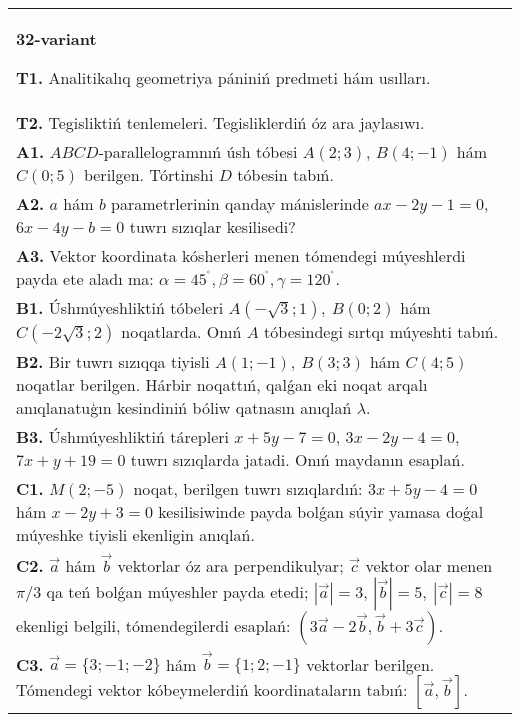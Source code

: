\documentclass{article}
\begin{document}
\begin{tabular}{m{17cm}}
\textbf{32-variant}

\textbf{T1.} Analitikalıq geometriya pániniń predmeti hám usılları.
 \\
\textbf{T2.} 
Tegisliktiń tenlemeleri. Tegisliklerdiń óz ara jaylasıwı.
 \\
\textbf{A1.} 
$ABCD$-parallelogramnıń úsh tóbesi
$A (2;3) $, $B (4;-1) $ hám $C (0;5) $ berilgen. Tórtinshi $D$
tóbesin tabıń.
 \\
\textbf{A2.} 
$a$ hám $b$ parametrlerinin qanday mánislerinde
$ax-2y-1=0$, $6x-4y-b=0$ tuwrı sızıqlar kesilisedi?
 \\
\textbf{A3.} 
Vektor koordinata kósherleri menen tómendegi múyeshlerdi payda ete aladı ma:
$\alpha = 45^{{^\circ}},\beta = 60^{{^\circ}},\gamma = 120^{{^\circ}}$.
 \\
\textbf{B1.} 
Úshmúyeshliktiń tóbeleri
\(A\left(-\sqrt{3};1 \right),\ B (0;2) \) hám
\(C\left(-2\sqrt{3};2 \right) \) noqatlarda. Onıń $A$
tóbesindegi sırtqı múyeshti tabıń.
 \\
\textbf{B2.} 
Bir tuwrı sızıqqa tiyisli \(A (1;-1),\ B (3;3) \) hám
\(C (4;5) \) noqatlar berilgen. Hárbir noqattıń, qalǵan eki noqat arqalı anıqlanatuģın kesindiniń bóliw qatnasın anıqlań $\lambda$.
 \\
\textbf{B3.} 
Úshmúyeshliktiń tárepleri \(x+5y-7=0\),
\(3x-2y-4=0\), \(7x+y+19=0\) tuwrı sızıqlarda jatadi. Onıń
maydanın esaplań.
 \\
\textbf{C1.} 
\(M (2;-5) \) noqat, berilgen tuwrı sızıqlardıń:
\(3x+5y-4=0\) hám \(x-2y+3=0\) kesilisiwinde payda 
bolǵan súyir yamasa doǵal múyeshke tiyisli ekenligin anıqlań.
 \\
\textbf{C2.} 
$\vec{a}$ hám $\vec{b}$ vektorlar óz ara perpendikulyar; $\vec{c}$ vektor olar menen $\pi/3$ qa teń bolǵan múyeshler payda etedi; $|\vec{a}| = 3$, $|\vec{b}| = 5,\ |\vec{c}| = 8$ ekenligi belgili, tómendegilerdi esaplań:
$\left(3\vec{a} - 2\vec{b},\vec{b} + 3\vec{c} \right) $.
 \\
\textbf{C3.} 
$\vec{a} = \{ 3; - 1; - 2\}$ hám $\vec{b} = \{ 1;2; - 1\}$ vektorlar berilgen. Tómendegi vektor kóbeymelerdiń koordinataların tabıń:
$\left\lbrack \vec{a},\vec{b} \right\rbrack$.
 \\

\end{tabular}
\vspace{1cm}
\end{document}
